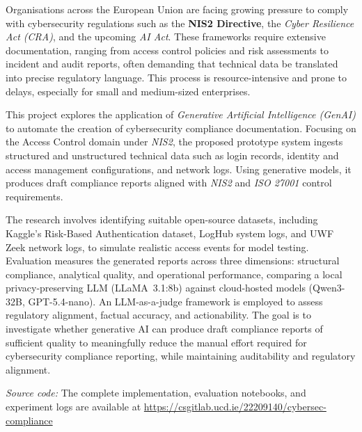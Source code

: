 \documentclass[]{UCD_CS_FYP_Report}
\begin{document}
\maketitle


\tableofcontents
{}\newpage
\newpage


\abstract
    Organisations across the European Union are facing growing pressure to comply with cybersecurity regulations such as the \textbf{NIS2 Directive}, the \textit{Cyber Resilience Act (CRA)}, and the upcoming \textit{AI Act}. These frameworks require extensive documentation, ranging from access control policies and risk assessments to incident and audit reports, often demanding that technical data be translated into precise regulatory language. This process is resource-intensive and prone to delays, especially for small and medium-sized enterprises.

    This project explores the application of \textit{Generative Artificial Intelligence (GenAI)} to automate the creation of cybersecurity compliance documentation. Focusing on the Access Control domain under \textit{NIS2}, the proposed prototype system ingests structured and unstructured technical data such as login records, identity and access management configurations, and network logs. Using generative models, it produces draft compliance reports aligned with \textit{NIS2} and \textit{ISO 27001} control requirements.

    The research involves identifying suitable open-source datasets, including Kaggle's Risk-Based Authentication dataset, LogHub system logs, and UWF Zeek network logs, to simulate realistic access events for model testing. Evaluation measures the generated reports across three dimensions: structural compliance, analytical quality, and operational performance, comparing a local privacy-preserving LLM (LLaMA~3.1:8b) against cloud-hosted models (Qwen3-32B, GPT-5.4-nano). An LLM-as-a-judge framework is employed to assess regulatory alignment, factual accuracy, and actionability. The goal is to investigate whether generative AI can produce draft compliance reports of sufficient quality to meaningfully reduce the manual effort required for cybersecurity compliance reporting, while maintaining auditability and regulatory alignment.

    \vspace{1em}
    \noindent\textit{Source code:} The complete implementation, evaluation notebooks, and experiment logs are available at \url{https://csgitlab.ucd.ie/22209140/cybersec-compliance}
\end{document}
